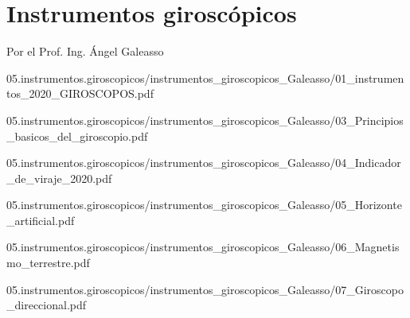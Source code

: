 %




\chapter{Instrumentos girosc\'opicos}
\label{sec:instrumentos.giroscopicos}

\begin{flushright}
  Por el Prof. Ing. Ángel Galeasso
\end{flushright}


\begin{landscape}

  
  {05.instrumentos.giroscopicos/instrumentos_giroscopicos_Galeasso/01_instrumentos_2020_GIROSCOPOS.pdf}

  
  {05.instrumentos.giroscopicos/instrumentos_giroscopicos_Galeasso/03_Principios_basicos_del_giroscopio.pdf}

  
  {05.instrumentos.giroscopicos/instrumentos_giroscopicos_Galeasso/04_Indicador_de_viraje_2020.pdf}

\end{landscape}

  
  {05.instrumentos.giroscopicos/instrumentos_giroscopicos_Galeasso/05_Horizonte_artificial.pdf}

  \begin{landscape}

  
  {05.instrumentos.giroscopicos/instrumentos_giroscopicos_Galeasso/06_Magnetismo_terrestre.pdf}

  
  {05.instrumentos.giroscopicos/instrumentos_giroscopicos_Galeasso/07_Giroscopo_direccional.pdf}
    
  \end{landscape}


